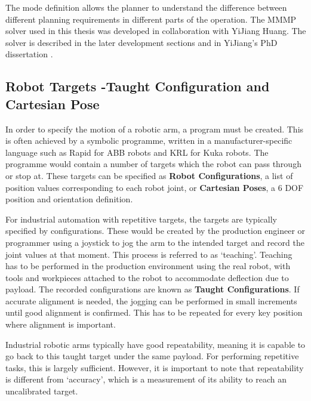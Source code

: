 The mode definition allows the planner to understand the difference between different planning requirements in different parts of the operation. The MMMP solver used in this thesis was developed in collaboration with YiJiang Huang. The solver is described in the later development sections  and in YiJiang’s PhD dissertation \parencite{huangAlgorithmicPlanningRobotic2022}.

\subsection{Robot Targets -Taught Configuration and Cartesian Pose}
\label{subsection:exploration-3-robot-targets-taught-configuration-and-cartesian-pose}

In order to specify the motion of a robotic arm, a program must be created. This is often achieved by a symbolic programme, written in a manufacturer-specific language such as Rapid for ABB robots and KRL for Kuka robots. The programme would contain a number of targets which the robot can pass through or stop at. These targets can be specified as \textbf{Robot Configurations}, a list of position values corresponding to each robot joint, or \textbf{Cartesian Poses}, a 6 DOF position and orientation definition.

For industrial automation with repetitive targets, the targets are typically specified by configurations. These would be created by the production engineer or programmer using a joystick to jog the arm to the intended target and record the joint values at that moment. This process is referred to as ‘teaching’. Teaching has to be performed in the production environment using the real robot, with tools and workpieces attached to the robot to accommodate deflection due to payload. The recorded configurations are known as \textbf{Taught Configurations}. If accurate alignment is needed, the jogging can be performed in small increments until good alignment is confirmed. This has to be repeated for every key position where alignment is important. 

Industrial robotic arms typically have good repeatability, meaning it is capable to go back to this taught target under the same payload. For performing repetitive tasks, this is largely sufficient. However, it is important to note that repeatability is different from ‘accuracy’, which is a measurement of its ability to reach an uncalibrated target. 

